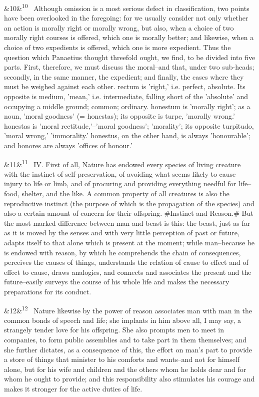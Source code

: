 \documentclass[12pt]{article}
\newcommand{\para}[1][]{\par\noindent\ifx&#1&\else\textsuperscript{\footnotesize #1}~\fi}
\begin{document}
\para[10] Although omission is a most serious defect in classification, two points have been overlooked in the foregoing: for we usually consider not only whether an action is morally right or morally wrong, but also, when a choice of two morally right courses is offered, which one is morally better; and likewise, when a choice of two expedients is offered, which one is more expedient. Thus the question which Panaetius thought threefold ought, we find, to be divided into five parts. First, therefore, we must discuss the moral--and that, under two sub-heads; secondly, in the same manner, the expedient; and finally, the cases where they must be weighed against each other. rectum is 'right,' i.e. perfect, absolute. Its opposite is medium, 'mean,' i.e. intermediate, falling short of the 'absolute' and occupying a middle ground; common; ordinary. honestum is 'morally right'; as a noun, 'moral goodness' (= honestas); its opposite is turpe, 'morally wrong.' honestas is 'moral rectitude,'--'moral goodness'; 'morality'; its opposite turpitudo, 'moral wrong,' 'immorality.' honestus, on the other hand, is always 'honourable'; and honores are always 'offices of honour.'

\para[11] IV. First of all, Nature has endowed every species of living creature with the instinct of self-preservation, of avoiding what seems likely to cause injury to life or limb, and of procuring and providing everything needful for life--food, shelter, and the like. A common property of all creatures is also the reproductive instinct (the purpose of which is the propagation of the species) and also a certain amount of concern for their offspring. \#Instinct and Reason.\# But the most marked difference between man and beast is this: the beast, just as far as it is moved by the senses and with very little perception of past or future, adapts itself to that alone which is present at the moment; while man--because he is endowed with reason, by which he comprehends the chain of consequences, perceives the causes of things, understands the relation of cause to effect and of effect to cause, draws analogies, and connects and associates the present and the future--easily surveys the course of his whole life and makes the necessary preparations for its conduct.

\para[12] Nature likewise by the power of reason associates man with man in the common bonds of speech and life; she implants in him above all, I may say, a strangely tender love for his offspring. She also prompts men to meet in companies, to form public assemblies and to take part in them themselves; and she further dictates, as a consequence of this, the effort on man's part to provide a store of things that minister to his comforts and wants--and not for himself alone, but for his wife and children and the others whom he holds dear and for whom he ought to provide; and this responsibility also stimulates his courage and makes it stronger for the active duties of life.
\end{document}
